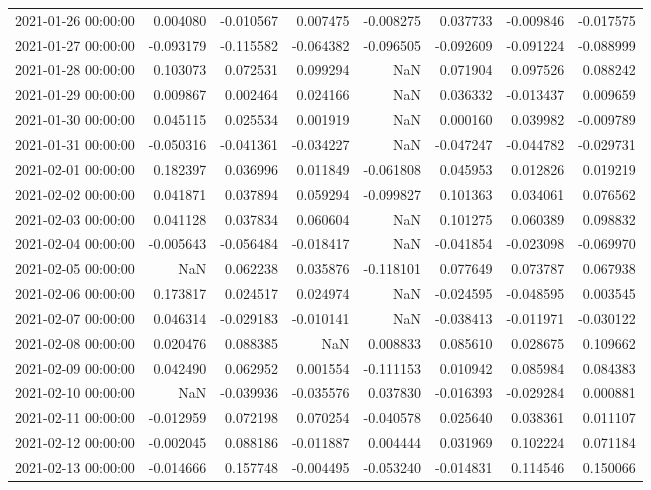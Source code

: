 \begin{tabular}{lrrrrrrr}
2021-01-26 00:00:00 & 0.004080 & -0.010567 & 0.007475 & -0.008275 & 0.037733 & -0.009846 & -0.017575 \\
2021-01-27 00:00:00 & -0.093179 & -0.115582 & -0.064382 & -0.096505 & -0.092609 & -0.091224 & -0.088999 \\
2021-01-28 00:00:00 & 0.103073 & 0.072531 & 0.099294 & NaN & 0.071904 & 0.097526 & 0.088242 \\
2021-01-29 00:00:00 & 0.009867 & 0.002464 & 0.024166 & NaN & 0.036332 & -0.013437 & 0.009659 \\
2021-01-30 00:00:00 & 0.045115 & 0.025534 & 0.001919 & NaN & 0.000160 & 0.039982 & -0.009789 \\
2021-01-31 00:00:00 & -0.050316 & -0.041361 & -0.034227 & NaN & -0.047247 & -0.044782 & -0.029731 \\
2021-02-01 00:00:00 & 0.182397 & 0.036996 & 0.011849 & -0.061808 & 0.045953 & 0.012826 & 0.019219 \\
2021-02-02 00:00:00 & 0.041871 & 0.037894 & 0.059294 & -0.099827 & 0.101363 & 0.034061 & 0.076562 \\
2021-02-03 00:00:00 & 0.041128 & 0.037834 & 0.060604 & NaN & 0.101275 & 0.060389 & 0.098832 \\
2021-02-04 00:00:00 & -0.005643 & -0.056484 & -0.018417 & NaN & -0.041854 & -0.023098 & -0.069970 \\
2021-02-05 00:00:00 & NaN & 0.062238 & 0.035876 & -0.118101 & 0.077649 & 0.073787 & 0.067938 \\
2021-02-06 00:00:00 & 0.173817 & 0.024517 & 0.024974 & NaN & -0.024595 & -0.048595 & 0.003545 \\
2021-02-07 00:00:00 & 0.046314 & -0.029183 & -0.010141 & NaN & -0.038413 & -0.011971 & -0.030122 \\
2021-02-08 00:00:00 & 0.020476 & 0.088385 & NaN & 0.008833 & 0.085610 & 0.028675 & 0.109662 \\
2021-02-09 00:00:00 & 0.042490 & 0.062952 & 0.001554 & -0.111153 & 0.010942 & 0.085984 & 0.084383 \\
2021-02-10 00:00:00 & NaN & -0.039936 & -0.035576 & 0.037830 & -0.016393 & -0.029284 & 0.000881 \\
2021-02-11 00:00:00 & -0.012959 & 0.072198 & 0.070254 & -0.040578 & 0.025640 & 0.038361 & 0.011107 \\
2021-02-12 00:00:00 & -0.002045 & 0.088186 & -0.011887 & 0.004444 & 0.031969 & 0.102224 & 0.071184 \\
2021-02-13 00:00:00 & -0.014666 & 0.157748 & -0.004495 & -0.053240 & -0.014831 & 0.114546 & 0.150066 \\

\end{tabular}
